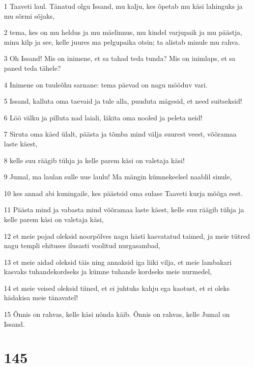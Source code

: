 \par 1 Taaveti laul. Tänatud olgu Issand, mu kalju, kes õpetab mu käsi lahinguks ja mu sõrmi sõjaks,
\par 2 tema, kes on mu heldus ja mu mäelinnus, mu kindel varjupaik ja mu päästja, minu kilp ja see, kelle juures ma pelgupaika otsin; ta alistab minule mu rahva.
\par 3 Oh Issand! Mis on inimene, et sa tahad teda tunda? Mis on inimlaps, et sa paned teda tähele?
\par 4 Inimene on tuuleõhu sarnane: tema päevad on nagu mööduv vari.
\par 5 Issand, kalluta oma taevaid ja tule alla, puuduta mägesid, et need suitseksid!
\par 6 Löö välku ja pilluta nad laiali, läkita oma nooled ja peleta neid!
\par 7 Siruta oma käed ülalt, päästa ja tõmba mind välja suurest veest, võõramaa laste käest,
\par 8 kelle suu räägib tühja ja kelle parem käsi on valetaja käsi!
\par 9 Jumal, ma laulan sulle uue laulu! Ma mängin kümnekeelsel naablil sinule,
\par 10 kes annad abi kuningaile, kes päästsid oma sulase Taaveti kurja mõõga eest.
\par 11 Päästa mind ja vabasta mind võõramaa laste käest, kelle suu räägib tühja ja kelle parem käsi on valetaja käsi,
\par 12 et meie pojad oleksid noorpõlves nagu hästi kasvatatud taimed, ja meie tütred nagu templi ehituses ilusasti voolitud nurgasambad,
\par 13 et meie aidad oleksid täis ning annaksid iga liiki vilja, et meie lambakari kasvaks tuhandekordseks ja kümne tuhande kordseks meie nurmedel,
\par 14 et meie veised oleksid tiined, et ei juhtuks kahju ega kaotust, et ei oleks hädakisa meie tänavatel!
\par 15 Õnnis on rahvas, kelle käsi nõnda käib. Õnnis on rahvas, kelle Jumal on Issand.

\chapter{145}

